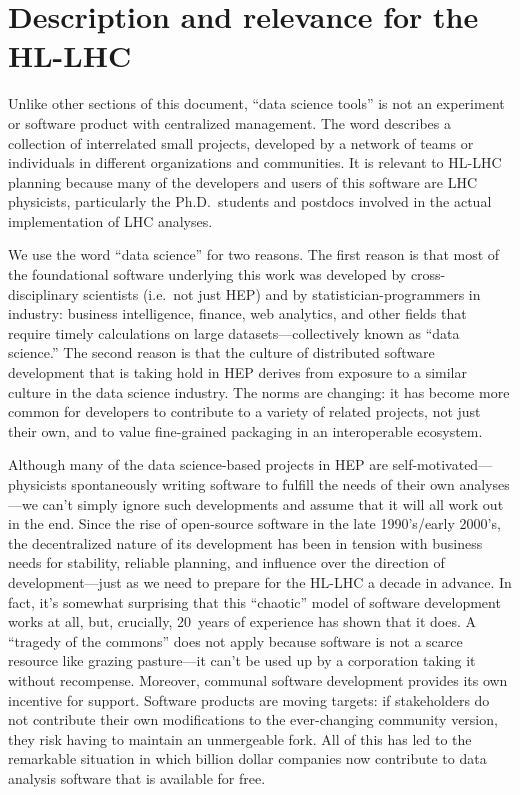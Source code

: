 \documentclass{article}
\begin{document}
\section{Description and relevance for the HL-LHC}

Unlike other sections of this document, ``data science tools'' is not an experiment or software product with centralized management. The word describes a collection of interrelated small projects, developed by a network of teams or individuals in different organizations and communities. It is relevant to HL-LHC planning because many of the developers and users of this software are LHC physicists, particularly the Ph.D.\ students and postdocs involved in the actual implementation of LHC analyses.

We use the word ``data science'' for two reasons. The first reason is that most of the foundational software underlying this work was developed by cross-disciplinary scientists (i.e.\ not just HEP) and by statistician-programmers in industry: business intelligence, finance, web analytics, and other fields that require timely calculations on large datasets---collectively known as ``data science.'' The second reason is that the culture of distributed software development that is taking hold in HEP derives from exposure to a similar culture in the data science industry. The norms are changing: it has become more common for developers to contribute to a variety of related projects, not just their own, and to value fine-grained packaging in an interoperable ecosystem.

Although many of the data science-based projects in HEP are self-motivated---physicists spontaneously writing software to fulfill the needs of their own analyses---we can't simply ignore such developments and assume that it will all work out in the end. Since the rise of open-source software in the late 1990's/early 2000's, the decentralized nature of its development has been in tension with business needs for stability, reliable planning, and influence over the direction of development---just as we need to prepare for the HL-LHC a decade in advance. In fact, it's somewhat surprising that this ``chaotic'' model of software development works at all, but, crucially, 20~years of experience has shown that it does. A ``tragedy of the commons'' does not apply because software is not a scarce resource like grazing pasture---it can't be used up by a corporation taking it without recompense. Moreover, communal software development provides its own incentive for support. Software products are moving targets: if stakeholders do not contribute their own modifications to the ever-changing community version, they risk having to maintain an unmergeable fork. All of this has led to the remarkable situation in which billion dollar companies now contribute to data analysis software that is available for free.
\end{document}
